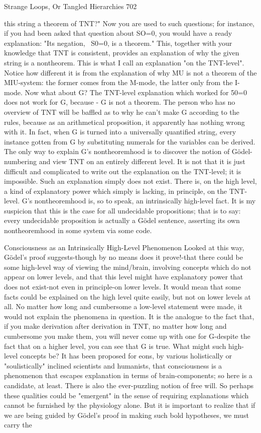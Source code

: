 Strange Loops, Or Tangled Hierarchies                                                    702

this string a theorem of TNT?" Now you are used to such questions; for instance, if you
had been asked that question about SO=0, you would have a ready explanation: "Its
negation, ~S0=0, is a theorem." This, together with your knowledge that TNT is
consistent, provides an explanation of why the given string is a nontheorem. This is what
I call an explanation "on the TNT-level". Notice how different it is from the explanation
of why MU is not a theorem of the MIU-system: the former comes from the M-mode, the
latter only from the I-mode.
         Now what about G? The TNT-level explanation which worked for 50=0 does not
work for G, because - G is not a theorem. The person who has no overview of TNT will
be baffled as to why he can't make G according to the rules, because as an arithmetical
proposition, it apparently has nothing wrong with it. In fact, when G is turned into a
universally quantified string, every instance gotten from G by substituting numerals for
the variables can be derived. The only way to explain G's nontheoremhood is to discover
the notion of Gödel-numbering and view TNT on an entirely different level. It is not that
it is just difficult and complicated to write out the explanation on the TNT-level; it is
impossible. Such an explanation simply does not exist. There is, on the high level, a kind
of explanatory power which simply is lacking, in principle, on the TNT-level. G's
nontheoremhood is, so to speak, an intrinsically high-level fact. It is my suspicion that
this is the case for all undecidable propositions; that is to say: every undecidable
proposition is actually a Gödel sentence, asserting its own nontheoremhood in some
system via some code.

         Consciousness as an Intrinsically High-Level Phenomenon
Looked at this way, Gödel’s proof suggests-though by no means does it prove!-that there
could be some high-level way of viewing the mind/brain, involving concepts which do
not appear on lower levels, and that this level might have explanatory power that does not
exist-not even in principle-on lower levels. It would mean that some facts could be
explained on the high level quite easily, but not on lower levels at all. No matter how
long and cumbersome a low-level statement were made, it would not explain the
phenomena in question. It is the analogue to the fact that, if you make derivation after
derivation in TNT, no matter how long and cumbersome you make them, you will never
come up with one for G-despite the fact that on a higher level, you can see that G is true.
        What might such high-level concepts be? It has been proposed for eons, by
various holistically or "soulistically" inclined scientists and humanists, that consciousness
is a phenomenon that escapes explanation in terms of brain-components; so here is a
candidate, at least. There is also the ever-puzzling notion of free will. So perhaps these
qualities could be "emergent" in the sense of requiring explanations which cannot be
furnished by the physiology alone. But it is important to realize that if we are being
guided by Gödel’s proof in making such bold hypotheses, we must carry the




